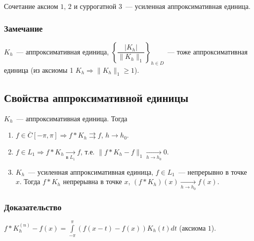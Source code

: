 \documentclass{article}
\begin{document}
                Сочетание аксиом $1$, $2$ и суррогатной $3$~--- усиленная аппроксимативная единица.
                
            \subsubsection{Замечание}
            
                $K_h$~--- аппроксимативная единица, $\left\{ \dfrac{|K_h|}{\|K_h\|_1} \right\}_{h \in D}$~--- тоже аппроксимативная единица (из аксиомы 1 $K_h \Rightarrow \| K_h \|_1 \geqslant 1$).
                
    \subsection{Свойства аппроксимативной единицы}
    
        $K_h$~--- аппроксимативная единица. Тогда
        
        \begin{enumerate}
        
            \item $f \in \overline{C} [-\pi, \pi] \Rightarrow f * K_h \rightrightarrows f$, $h \rightarrow h_0$.
            
            \item $f \in L_1 \Rightarrow f * K_h \xrightarrow[\text{в }L_1]{} f$, т.е. $\| f * K_h - f \|_1 \xrightarrow[h \rightarrow h_0]{} 0$.
            
            \item $K_h$~--- усиленная аппроксимативная единица, $f \in L_1$~--- непрерывно в точке $x$. Тогда $f * K_h$ непрерывна в точке $x$, $(f * K_h)(x) \xrightarrow[h \rightarrow h_0]{} f(x)$.
            
        \end{enumerate}
        
        \subsubsection{Доказательство}
        
            $f * K_h^{(n)} - f(x) = \int\limits^{\pi}_{-\pi} \left( f(x - t) - f(x) \right) K_h(t) dt$ (аксиома $1$).
                
\end{document}
